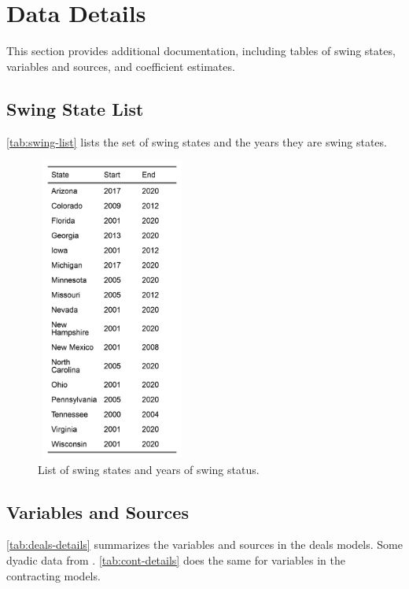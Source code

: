 \documentclass[12pt]{article}
\begin{document}
\newpage

\section{Data Details}
\afterpage{\clearpage}
This section provides additional documentation, including tables of swing states, variables and sources, and coefficient estimates.  

\subsection{Swing State List}

\autoref{tab:swing-list} lists the set of swing states and the years they are swing states.
\begin{figure}[htpb]
	\centering
		\includegraphics[width=5cm, height=10cm,keepaspectratio]{swing-list.png}
	\caption{List of swing states and years of swing status.}
	\label{tab:swing-list}
\end{figure}


\subsection{Variables and Sources}

\autoref{tab:deals-details} summarizes the variables and sources in the deals models. Some dyadic data from \citet{peacesciencer-package}. 
\autoref{tab:cont-details} does the same for variables in the contracting models. 
\end{document}

